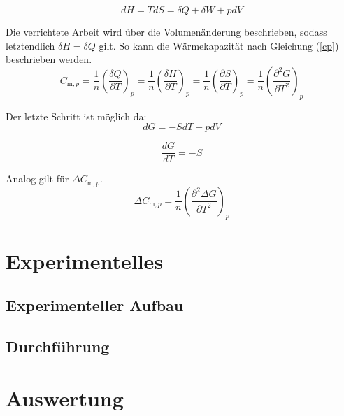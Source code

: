 \documentclass[a4paper,12pt,oneside,onecolum,final,openany]{report}
\begin{document}
\begin{equation}
dH = TdS = \delta Q + \delta W +pdV
\end{equation}
 
Die verrichtete Arbeit wird über die Volumenänderung beschrieben, sodass letztendlich $\delta H = \delta Q$ gilt. So kann die Wärmekapazität nach Gleichung (\ref{cp}) beschrieben werden.\\

\begin{equation} \label{cp}
C_{\mathrm{m},p} =\frac{1}{n} \left(\frac{\delta Q}{\partial T}\right)_p =\frac{1}{n} \left(\frac{\delta H}{\partial T}\right)_p = \frac{1}{n} \left(\frac{\partial S}{\partial T}\right)_p= \frac{1}{n} \left(\frac{\partial^2 G}{\partial T^2}\right)_p
\end{equation}

Der letzte Schritt ist möglich da:\\

\begin{equation}
dG =-SdT -pdV
\end{equation}

\begin{equation}
\frac{dG}{dT}= -S
\end{equation}

Analog gilt für $\Delta C_{\mathrm{m},p}$.\\

\begin{equation}
\Delta C_{\mathrm{m},p} = \frac{1}{n} \left(\frac{\partial^2 \Delta G}{\partial T^2}\right)_p
\end{equation}




\chapter{Experimentelles}
\section{Experimenteller Aufbau}

\section{Durchführung}

\chapter{Auswertung}
\end{document}
